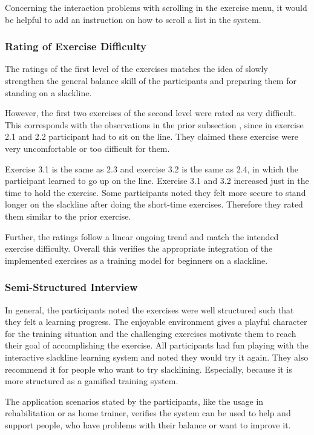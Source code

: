 Concerning the interaction problems with scrolling in the exercise menu, it would be helpful to add an instruction on how to scroll a list in the system.

\subsubsection{Rating of Exercise Difficulty}
The ratings of the first level of the exercises matches the idea of slowly strengthen the general balance skill of the participants and preparing them for standing on a slackline.

However, the first two exercises of the second level were rated as very difficult.
This corresponds with the observations in the prior subsection \textit{}, since in exercise 2.1 and 2.2 participant had to sit on the line.
They claimed these exercise were very uncomfortable or too difficult for them.

Exercise 3.1 is the same as 2.3 and exercise 3.2 is the same as 2.4, in which the participant learned to go up on the line.
Exercise 3.1 and 3.2 increased just in the time to hold the exercise.
Some participants noted they felt more secure to stand longer on the slackline after doing the short-time exercises.
Therefore they rated them similar to the prior exercise.

Further, the ratings follow a linear ongoing trend and match the intended exercise difficulty.
Overall this verifies the appropriate integration of the implemented exercises as a training model for beginners on a slackline.

\subsubsection{Semi-Structured Interview}
In general, the participants noted the exercises were well structured such that they felt a learning progress.
The enjoyable environment gives a playful character for the training situation and the challenging exercises motivate them to reach their goal of accomplishing the exercise.
All participants had fun playing with the interactive slackline learning system and noted they would try it again.
They also recommend it for people who want to try slacklining.
Especially, because it is more structured as a gamified training system.

The application scenarios stated by the participants, like the usage in rehabilitation or as home trainer, verifies the system can be used to help and support people, who have problems with their balance or want to improve it.